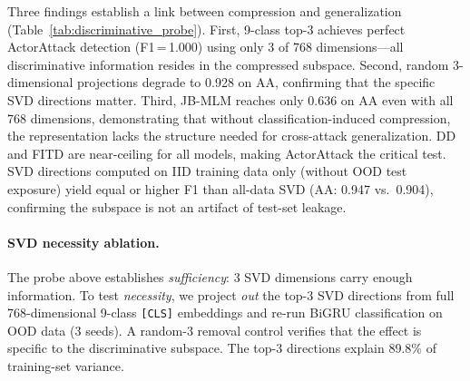 Three findings establish a link between compression and generalization (Table~\ref{tab:discriminative_probe}). First, 9-class top-3 achieves perfect ActorAttack detection (F1\,=\,1.000) using only 3 of 768 dimensions---all discriminative information resides in the compressed subspace. Second, random 3-dimensional projections degrade to 0.928 on AA, confirming that the specific SVD directions matter. Third, JB-MLM reaches only 0.636 on AA even with all 768 dimensions, demonstrating that without classification-induced compression, the representation lacks the structure needed for cross-attack generalization. DD and FITD are near-ceiling for all models, making ActorAttack the critical test.
SVD directions computed on IID training data only (without OOD test exposure) yield equal or higher F1 than all-data SVD (AA: 0.947 vs.\ 0.904), confirming the subspace is not an artifact of test-set leakage.

\paragraph{SVD necessity ablation.}
\label{app:svd_necessity}

The probe above establishes \emph{sufficiency}: 3 SVD dimensions carry enough information. To test \emph{necessity}, we project \emph{out} the top-3 SVD directions from full 768-dimensional 9-class \texttt{[CLS]} embeddings and re-run BiGRU classification on OOD data (3 seeds). A random-3 removal control verifies that the effect is specific to the discriminative subspace. The top-3 directions explain 89.8\% of training-set variance.

\begin{table}[ht]
\centering
\footnotesize
\caption{SVD necessity ablation: OOD F1 after projecting out top-3 vs.\ random-3 SVD directions from 9-class layer-10 embeddings (3-seed mean$\pm$std).}
\label{tab:svd_necessity}
\end{table}


